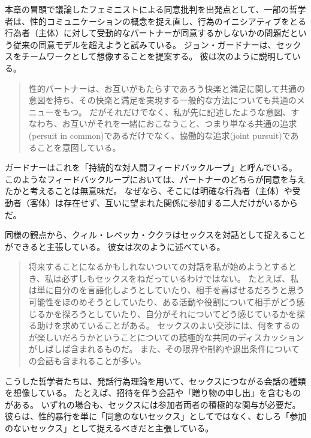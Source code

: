 \documentclass[paper=a4,book,openany]{jlreq}
\newcommand{\ig}[1]{}           %
\begin{document}
本章の冒頭で議論したフェミニストによる同意批判を出発点として、一部の哲学者は、性的コミュニケーションの概念を捉え直し、行為のイニシアティブをとる行為者（主体）に対して受動的なパートナーが同意するかしないかの問題だという従来の同意モデルを超えようと試みている。
ジョン・ガードナーは、セックスをチームワークとして想像することを提案する。
彼は次のように説明している。

\begin{quote}
性的パートナーは、お互いがもたらすであろう快楽と満足に関して共通の意図を持ち、その快楽と満足を実現する一般的な方法についても共通のメニューをもつ。
だがそれだけでなく、私が先に記述したような意図、すなわち、お互いがそれを一緒におこなうこと、つまり単なる共通の追求(persuit in common)であるだけでなく、協働的な追求(joint pursuit)であることを意図している。
\citep[p.54]{gardner18:_oppos_rape}
\end{quote}

ガードナー\ig{Gardner}はこれを「持続的な対人間フィードバックループ」と呼んでいる\citep[p.55]{gardner18:_oppos_rape}。
このようなフィードバックループにおいては、パートナーのどちらが同意を与えたかと考えることは無意味だ。
なぜなら、そこには明確な行為者（主体）や受動者（客体）は存在せず、互いに望まれた関係に参加する二人だけがいるからだ。

同様の観点から、クィル・レベッカ・ククラはセックスを対話として捉えることができると主張している。
彼女は次のように述べている。

\begin{quote}
将来することになるかもしれないついての対話を私が始めようとするとき、私は必ずしもセックスをねだっているわけではない。
たとえば、私は単に自分のを言語化しようとしていたり、相手を喜ばせるだろうと思う可能性をほのめそうとしていたり、ある活動や役割について相手がどう感じるかを探ろうとしていたり、自分がそれについてどう感じているかを探る助けを求めていることがある。
セックスのよい交渉には、何をするのが楽しいだろうかということについての積極的な共同のディスカッションがしばしば含まれるものだ。
また、その限界や制約や退出条件についての会話も含まれることが多い。
\citep[p.76]{kukla18:_thats_what_she_said}
\end{quote}

こうした哲学者たちは、発話行為理論を用いて、セックスにつながる会話の種類を想像している。
たとえば、招待を伴う会話や「贈り物の申し出」を含むものがある\citep[p.74]{kukla18:_thats_what_she_said}。
いずれの場合も、セックスには参加者両者の積極的な関与が必要だ。
彼らは、性的暴行を単に「同意のないセックス」としてではなく、むしろ「参加のないセックス」として捉えるべきだと主張している。
\end{document}
